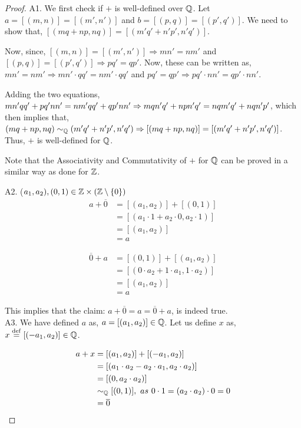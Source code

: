 \documentclass[11pt]{scrartcl}
\begin{document}
\begin{proof}
	A1. We first check if $+$ is well-defined over $\mathbb Q$. Let $a = [(m,n)] = [(m',n')]$ and $b = [(p,q)] = [(p',q')]$. We need to show that, $[(mq+np, nq)] = [(m'q'+n'p', n'q')]$.
	
	Now, since, $[(m,n)] = [(m',n')] \Rightarrow mn'=nm'$ and $[(p,q)] = [(p',q')] \Rightarrow pq' = qp'$. Now, these can be written as, $mn' = nm' \Rightarrow mn'\cdot qq' = nm' \cdot qq'$ and $pq' = qp' \Rightarrow pq' \cdot nn' = qp' \cdot nn'$.
	
	Adding the two equations, $mn'qq'+pq'nn' = nm'qq'+qp'nn'\\ \Rightarrow mqn'q' + npn'q' = nqm'q' + nqn'p'$, which then implies that,\\ $(mq+np, nq) \sim_{\mathbb Q} (m'q'+n'p', n'q') \Rightarrow [(mq+np, nq)] = [(m'q'+n'p', n'q')]$. Thus, $+$ is well-defined for $\mathbb Q$.
	
	\begin{remark}
		Note that the Associativity and Commutativity of $+$ for $\mathbb Q$ can be proved in a similar way as done for $\mathbb Z$.
	\end{remark}
	
	A2. ($a_{1}, a_{2}), (0,1) \in \mathbb Z \times (\mathbb Z \setminus \{0\})$
	\begin{align*}
		a + \overline{0} &= [(a_{1}, a_{2})] + [(0,1)]\\
		&= [(a_{1} \cdot 1 + a_{2}\cdot 0, a_{2}\cdot 1)]\\
		&= [(a_{1}, a_{2})]\\
		&= a
	\end{align*}

	\begin{align*}
		\overline{0} + a &=  [(0,1)]+[(a_{1}, a_{2})]\\
		&= [(0 \cdot a_{2}+1\cdot a_{1}, 1 \cdot a_{2})]\\
		&= [(a_{1}, a_{2})]\\
		&= a
	\end{align*}

	This implies that the claim: $a+\overline{0} = a = \overline{0}+a$, is indeed true.\\[2pt]
	
	A3. We have defined $a$ as, $a = [(a_1, a_2)] \in \mathbb Q$. Let us define $x$ as, $x \overset{\mathrm{def}}{=} [(-a_{1}, a_{2})] \in \mathbb Q$.
	
	\begin{align*}	
		a+x &= [(a_{1}, a_{2})] + [(-a_{1}, a_{2})]\\
		&= [(a_{1}\cdot a_{2}-a_{2}\cdot a_{1}, a_{2}\cdot a_{2})]\\
		&= [(0, a_{2}\cdot a_{2})]\\
		&\sim_{\mathbb Q} [(0,1)],\ as\ 0\cdot 1 = (a_{2}\cdot a_{2})\cdot 0 = 0\\
		&= \overline{0} 
	\end{align*} 


\end{proof}
\end{document}

